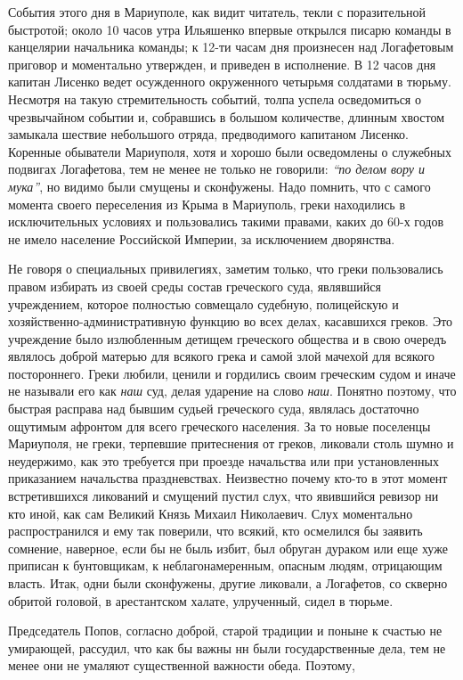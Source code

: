 \documentclass[a4paper,20pt]{article}
\begin{document}
События этого дня в Мариуполе, как видит читатель, текли с поразительной
быстротой; около 10 часов утра Ильяшенко впервые открылся писарю команды в
канцелярии начальника команды; к 12-ти часам дня произнесен над Логафетовым
приговор и моментально утвержден, и приведен в исполнение. В 12 часов дня
капитан Лисенко ведет осужденного окруженного четырьмя солдатами в тюрьму.
Несмотря на такую стремительность событий, толпа успела осведомиться о
чрезвычайном событии и, собравшись в большом количестве, длинным хвостом
замыкала шествие небольшого отряда, предводимого капитаном Лисенко.  Коренные
обыватели Мариуполя, хотя и хорошо были осведомлены о служебных подвигах
Логафетова, тем не менее не только не говорили: \emph{``по делом вору и
мука''}, но видимо были смущены и сконфужены. Надо помнить, что с самого
момента своего переселения из Крыма в Мариуполь, греки находились в
исключительных условиях и пользовались такими правами, каких до 60-х годов не
имело население Российской Империи, за исключением дворянства.

Не говоря о специальных привилегиях, заметим только, 
что греки пользовались правом избирать из своей
среды состав греческого суда, являвшийся учреждением,
которое полностью совмещало судебную, 
полицейскую и хозяйственно-административную функцию во всех делах, касавшихся
греков. Это учреждение было излюбленным детищем
греческого общества и в свою очередъ являлось доброй
матерью для всякого грека и самой злой мачехой для всякого
постороннего. Греки любили, ценили и гордились своим
греческим судом и иначе не называли его как \emph{наш}
суд, делая ударение на слово \emph{наш}. Понятно поэтому, что
быстрая расправа над бывшим судьей греческого суда,
являлась достаточно ощутимым афронтом для всего греческого населения.  За то
новые поселенцы Мариуполя, не греки, терпевшие притеснения от греков, ликовали
столь шумно и неудержимо, как это требуется при проезде начальства или при
установленных приказанием начальства праздневствах. Неизвестно почему кто-то в
этот момент встретившихся ликований и смущений пустил слух, что явившийся
ревизор ни кто иной, как сам Великий Князь Михаил Николаевич. Слух моментально
распространился и ему так поверили, что всякий, кто осмелился бы заявить
сомнение, наверное, если бы не быль избит, был обруган дураком или еще хуже
приписан к бунтовщикам, к неблагонамеренным, опасным людям, отрицающим власть.
Итак, одни были сконфужены, другие ликовали, а Логафетов, со скверно обритой
головой, в арестантском халате, улрученный, сидел в тюрьме.

Председатель Попов, согласно доброй, старой традиции
и поныне к счастью не умирающей, рассудил, что как
бы важны нн были государственные дела, тем не менее
они не умаляют существенной важности обеда. Поэтому,
\end{document}
